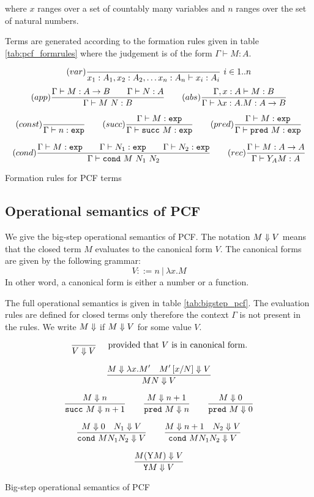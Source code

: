 where $x$ ranges over a set of countably many variables and $n$
ranges over the set of natural numbers.

Terms are generated according to the formation rules given in table
\ref{tab:pcf_formrules} where the judgement is of the form $ \Gamma  \vdash M : A$.

\begin{table}[htbp]
$$ (var) \frac{\displaystyle }{x_1:A_1, x_2:A_2, \ldots x_n : A_n  \vdash x_i : A_i}\ i \in 1..n$$
$$ (app) \frac{\displaystyle \Gamma \vdash M : A\rightarrow B \qquad \Gamma \vdash N:A}{\Gamma \vdash M\ N : B}
\qquad (abs) \frac{\displaystyle \Gamma, x:A \vdash M : B}{\Gamma \vdash \lambda x :A . M : A\rightarrow B}$$

$$ (const) \frac{\displaystyle }{\Gamma \vdash n :\texttt{exp}}
\qquad (succ) \frac{\displaystyle \Gamma \vdash M:\texttt{exp} }{\Gamma \vdash \texttt{succ}\ M:\texttt{exp}}
\qquad (pred) \frac{\displaystyle \Gamma \vdash M:\texttt{exp} }{\Gamma \vdash \texttt{pred}\ M:\texttt{exp}}$$

$$
(cond) \frac{\displaystyle \Gamma \vdash M : \texttt{exp} \qquad \Gamma \vdash N_1 : \texttt{exp} \qquad \Gamma \vdash N_2 : \texttt{exp} }{\Gamma \vdash \texttt{cond}\ M\ N_1\ N_2}
\qquad  (rec) \frac{\displaystyle \Gamma \vdash M : A\rightarrow A }{ \Gamma \vdash Y_A M : A}$$

\caption{Formation rules for PCF terms}
\label{tab:pcf_formrules}
\end{table}

\subsection{Operational semantics of PCF}

We give the big-step operational semantics of PCF. The notation $M \Downarrow V$ means
that the closed term $M$ evaluates to the canonical form $V$. The canonical forms are given by the following
grammar:
$$V ::= n\ |\ \lambda x. M$$
In other word, a canonical form is either a number or a function.

The full operational semantics is given in table
\ref{tab:bigstep_pcf}. The evaluation rules are defined for closed
terms only therefore the context $\Gamma$ is not present in the
rules. We write $M \Downarrow$ if $M \Downarrow V$ for some value $V$.

\begin{table}[htbp]
$$\frac{\displaystyle }{V \Downarrow V} \quad \mbox{ provided that $V$ is in canonical form.} $$

$$ \frac{\displaystyle M \Downarrow \lambda x. M' \quad M'\left[ x/N \right] \Downarrow V}{M N \Downarrow V}$$

$$\frac{\displaystyle M \Downarrow n}{\texttt{succ}\ M \Downarrow n+1}
\qquad \frac{\displaystyle M \Downarrow n+1}{\texttt{pred}\ M \Downarrow n}
\qquad \frac{\displaystyle M \Downarrow 0}{\texttt{pred}\ M \Downarrow 0}$$

$$\frac{\displaystyle M \Downarrow 0 \quad N_1 \Downarrow V}{\texttt{cond}\ M N_1 N_2  \Downarrow V}
\qquad
 \frac{\displaystyle M \Downarrow n+1 \quad N_2 \Downarrow V}{\texttt{cond}\ M N_1 N_2  \Downarrow V}$$

$$\frac{\displaystyle M (\mathrm{Y} M) \Downarrow V }{\texttt{Y} M \Downarrow V}$$
\label{tab:bigstep_pcf}
\caption{Big-step operational semantics of PCF}
\end{table}



